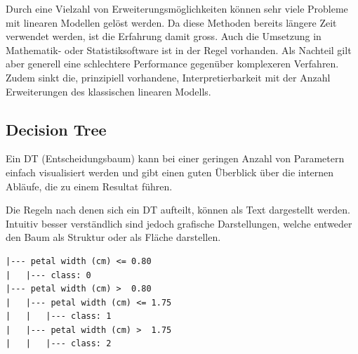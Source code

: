 \documentclass[
  12pt, %
  a4paper, %
  oneside, %
  openany, 
  numbers=noenddot, %
  BCOR=5mm, %
  parskip=half*, %
  thesis, %
]{bfhbook}
\begin{document}
Durch eine Vielzahl von Erweiterungsmöglichkeiten können sehr viele Probleme mit linearen Modellen gelöst werden. Da diese Methoden bereits längere Zeit verwendet werden, ist die Erfahrung damit gross. Auch die Umsetzung in Mathematik- oder Statistiksoftware ist in der Regel vorhanden. Als Nachteil gilt aber generell eine schlechtere Performance gegenüber komplexeren Verfahren. Zudem sinkt die, prinzipiell vorhandene, Interpretierbarkeit mit der Anzahl Erweiterungen des klassischen linearen Modells.

\subsection{Decision Tree}
\label{DT}
Ein \Gls{DT} (Entscheidungsbaum) kann bei einer geringen Anzahl von Parametern einfach visualisiert werden und gibt einen guten Überblick über die internen Abläufe, die zu einem Resultat führen.

\begin{minipage}[t]{0.45\linewidth}
\vspace{10pt}
Die Regeln nach denen sich ein \Gls{DT} aufteilt, können als Text dargestellt werden. Intuitiv besser verständlich sind jedoch grafische Darstellungen, welche entweder den Baum als Struktur oder als Fläche darstellen.
\end{minipage}\hfill
\begin{minipage}[t]{0.45\linewidth}
\begin{lstlisting}
|--- petal width (cm) <= 0.80
|   |--- class: 0
|--- petal width (cm) >  0.80
|   |--- petal width (cm) <= 1.75
|   |   |--- class: 1
|   |--- petal width (cm) >  1.75
|   |   |--- class: 2
\end{lstlisting}
\end{minipage}
\end{document}
